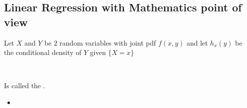 \subsection{Linear Regression with Mathematics point of view}
Let $X$ and $Y$ be $2$ random variables with joint pdf $f(x,y)$ and let
$h_{x}(y)$ be the conditional density of $Y$ given $\{X=x\}$\\
\begin{center}
	\\ 
\end{center}
Is called the .
\begin{itemize}
	\item
\end{itemize}
